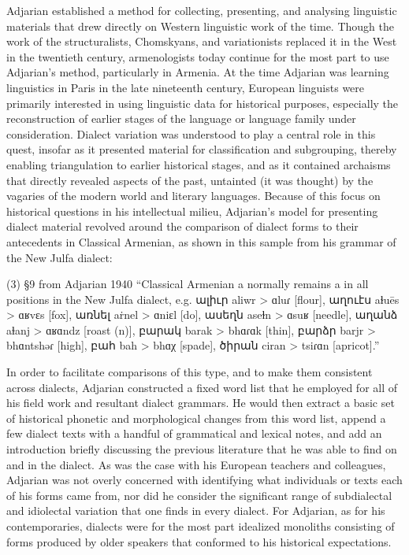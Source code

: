 Adjarian established a method for collecting, presenting, and analysing linguistic materials that drew directly on Western linguistic work of the time. Though the work of the structuralists, Chomskyans, and variationists replaced it in the West in the twentieth century, armenologists today continue for the most part to use Adjarian’s method, particularly in Armenia. At the time Adjarian was learning linguistics in Paris in the late nineteenth century, European linguists were primarily interested in using linguistic data for historical purposes, especially the reconstruction of earlier stages of the language or language family under consideration. Dialect variation was understood to play a central role in this quest, insofar as it presented material for classification and subgrouping, thereby enabling triangulation to earlier historical stages, and as it contained archaisms that directly revealed aspects of the past, untainted (it was thought) by the vagaries of the modern world and literary languages. Because of this focus on historical questions in his intellectual milieu, Adjarian’s model for presenting dialect material revolved around the comparison of dialect forms to their antecedents in Classical Armenian, as shown in this sample from his grammar of the New Julfa dialect:

\begin{exe}
	(3) 	§9 from Adjarian 1940 
	“Classical Armenian a normally remains a in all positions in the New Julfa dialect, e.g. ալիւր aliwr > ɑluɾ [flour], աղուէս aɫuēs > ɑʁvɛs [fox], առնել aṙnel > ɑniɛl [do], ասեղն aseɫn > ɑsuʁ [needle], աղանձ aɫanj > ɑʁɑndz [roast (n)], բարակ barak > bhɑɾɑk [thin], բարձր barjr > bhɑntshəɾ [high], բահ bah > bhɑχ [spade], ծիրան ciran > tsiɾɑn [apricot].”
	
\end{exe}

In order to facilitate comparisons of this type, and to make them consistent across dialects, Adjarian constructed a fixed word list that he employed for all of his field work and resultant dialect grammars. He would then extract a basic set of historical phonetic and morphological changes from this word list, append a few dialect texts with a handful of grammatical and lexical notes, and add an introduction briefly discussing the previous literature that he was able to find on and in the dialect. As was the case with his European teachers and colleagues, Adjarian was not overly concerned with identifying what individuals or texts each of his forms came from, nor did he consider the significant range of subdialectal and idiolectal variation that one finds in every dialect. For Adjarian, as for his contemporaries, dialects were for the most part idealized monoliths consisting of forms produced by older speakers that conformed to his historical expectations.


